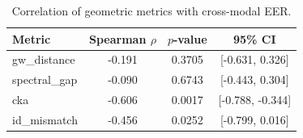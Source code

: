 \begin{table}[t]
\centering
\caption{Correlation of geometric metrics with cross-modal EER.}
\label{tab:correlations}
\begin{tabular}{lccc}
\toprule
Metric & Spearman $\rho$ & $p$-value & 95\% CI \\
\midrule
  gw_distance & -0.191 & 0.3705 & [-0.631, 0.326] \\
  spectral_gap & -0.090 & 0.6743 & [-0.443, 0.304] \\
  cka & -0.606 & 0.0017 & [-0.788, -0.344] \\
  id_mismatch & -0.456 & 0.0252 & [-0.799, 0.016] \\
\bottomrule
\end{tabular}
\end{table}